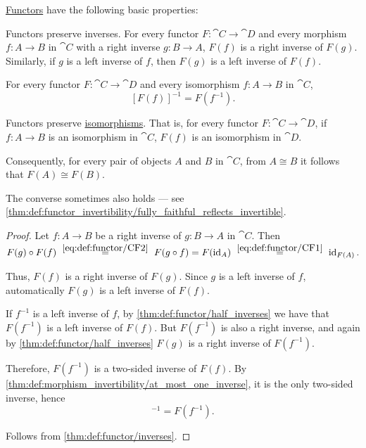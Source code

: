 \begin{proposition}\label{thm:def:functor}
  \hyperref[def:functor]{Functors} have the following basic properties:
  \begin{thmenum}
     Functors preserve inverses. For every functor \( F: \cat{C} \to \cat{D} \) and every morphism \( f: A \to B \) in \( \cat{C} \) with a right inverse \( g: B \to A \), \( F(f) \) is a right inverse of \( F(g) \). Similarly, if \( g \) is a left inverse of \( f \), then \( F(g) \) is a left inverse of \( F(f) \).

     For every functor \( F: \cat{C} \to \cat{D} \) and every isomorphism \( f: A \to B \) in \( \cat{C} \),
    \begin{equation}\label{eq:thm:def:functor/inverses}
      [F(f)]^{-1} = F(f^{-1}).
    \end{equation}

     Functors preserve \hyperref[def:morphism_invertibility/isomorphism]{isomorphisms}. That is, for every functor \( F: \cat{C} \to \cat{D} \), if \( f: A \to B \) is an isomorphism in \( \cat{C} \), \( F(f) \) is an isomorphism in \( \cat{D} \).

    Consequently, for every pair of objects \( A \) and \( B \) in \( \cat{C} \), from \( A \cong B \) it follows that \( F(A) \cong F(B) \).

    The converse sometimes also holds --- see \cref{thm:def:functor_invertibility/fully_faithful_reflects_invertible}.
  \end{thmenum}
\end{proposition}
\begin{proof}
   Let \( f: A \to B \) be a right inverse of \( g: B \to A \) in \( \cat{C} \). Then
  \begin{equation*}
    F(g) \bincirc F(f)
    \reloset {\eqref{eq:def:functor/CF2}} =
    F(g \bincirc f)
    =
    F(\id_A)
    \reloset {\eqref{eq:def:functor/CF1}} =
    \id_{F(A)}.
  \end{equation*}

  Thus, \( F(f) \) is a right inverse of \( F(g) \). Since \( g \) is a left inverse of \( f \), automatically \( F(g) \) is a left inverse of \( F(f) \).

   If \( f^{-1} \) is a left inverse of \( f \), by \cref{thm:def:functor/half_inverses} we have that \( F(f^{-1}) \) is a left inverse of \( F(f) \). But \( F(f^{-1}) \) is also a right inverse, and again by \cref{thm:def:functor/half_inverses} \( F(g) \) is a right inverse of \( F(f^{-1}) \).

  Therefore, \( F(f^{-1}) \) is a two-sided inverse of \( F(f) \). By \cref{thm:def:morphism_invertibility/at_most_one_inverse}, it is the only two-sided inverse, hence
  \begin{equation*}
    [F(f)]^{-1} = F(f^{-1}).
  \end{equation*}

   Follows from \cref{thm:def:functor/inverses}.
\end{proof}

